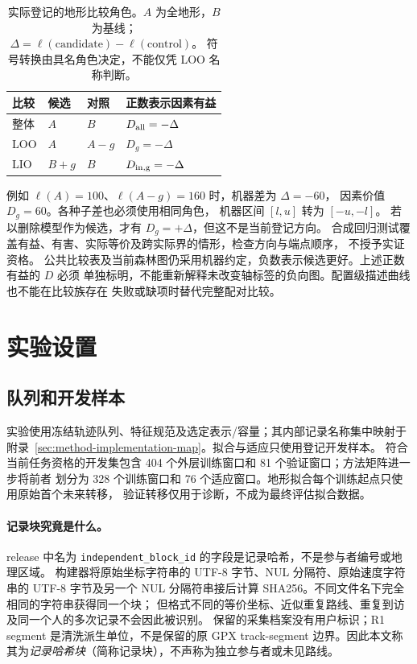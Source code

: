 \documentclass[UTF8,11pt]{ctexart}
\begin{document}
\begin{table}[htbp]
\centering\small
\caption{实际登记的地形比较角色。\(A\) 为全地形，\(B\) 为基线；
\(\Delta=\ell(\mathrm{candidate})-\ell(\mathrm{control})\)。
符号转换由具名角色决定，不能仅凭 LOO 名称判断。}
\label{tab:terrain-sign-roles}
\begin{tabular}{llll}
\toprule 比较 & 候选 & 对照 & 正数表示因素有益\\\midrule
整体 & \(A\) & \(B\) & \(D_{\rm all}=-\Delta\)\\
LOO & \(A\) & \(A-g\) & \(D_g=-\Delta\)\\
LIO & \(B+g\) & \(B\) & \(D_{\rm in,g}=-\Delta\)\\
\bottomrule
\end{tabular}
\end{table}
例如 \(\ell(A)=100\)、\(\ell(A-g)=160\) 时，机器差为 \(\Delta=-60\)，
因素价值 \(D_g=60\)。各种子差也必须使用相同角色，
机器区间 \([l,u]\) 转为 \([-u,-l]\)。
若以删除模型作为候选，才有 \(D_g=+\Delta\)，但这不是当前登记方向。
合成回归测试覆盖有益、有害、实际等价及跨实际界的情形，检查方向与端点顺序，
不授予实证资格。
公共比较表及当前森林图仍采用机器约定，负数表示候选更好。上述正数有益的 \(D\) 必须
单独标明，不能重新解释未改变轴标签的负向图。配置级描述曲线也不能在比较族存在
失败或缺项时替代完整配对比较。

\section{实验设置}
\subsection{队列和开发样本}
实验使用冻结轨迹队列、特征规范及选定表示/容量；其内部记录名称集中映射于
附录~\ref{sec:method-implementation-map}。拟合与适应只使用登记开发样本。
符合当前任务资格的开发集包含 404 个外层训练窗口和 81 个验证窗口；方法矩阵进一步将前者
划分为 328 个训练窗口和 76 个适应窗口。地形拟合每个训练起点只使用原始首个未来转移，
验证转移仅用于诊断，不成为最终评估拟合数据。

\paragraph{记录块究竟是什么。}
release 中名为 \texttt{independent\_block\_id} 的字段是记录哈希，不是参与者编号或地理区域。
构建器将原始坐标字符串的 UTF-8 字节、NUL 分隔符、原始速度字符串的 UTF-8 字节及另一个
NUL 分隔符串接后计算 SHA256。不同文件名下完全相同的字符串获得同一个块；
但格式不同的等价坐标、近似重复路线、重复到访及同一个人的多次记录不会因此被识别。
保留的采集档案没有用户标识；R1 segment 是清洗派生单位，不是保留的原 GPX track-segment
边界。因此本文称其为\emph{记录哈希块}（简称记录块），不声称为独立参与者或未见路线。
\end{document}
